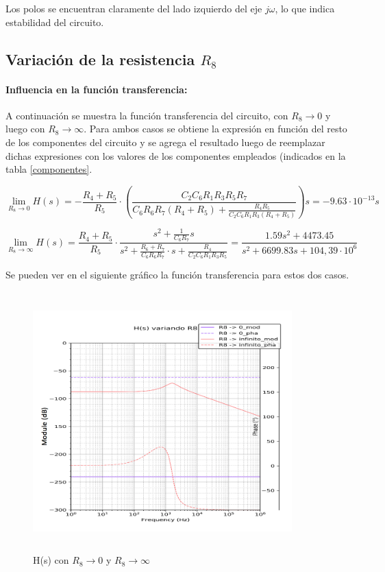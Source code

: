 Los polos se encuentran claramente del lado izquierdo del eje $j\omega$, lo que indica estabilidad del circuito.


\subsection{Variaci\'on de la resistencia $R_8$}

\paragraph*{Influencia en la funci\'on transferencia:} A continuaci\'on se muestra la funci\'on transferencia del circuito, con $R_8\to 0$ y luego con $R_8\to \infty$. Para ambos casos se obtiene la expresi\'on en funci\'on del resto de los componentes del circuito y se agrega el resultado luego de reemplazar dichas expresiones con los valores de los componentes empleados (indicados en la tabla \ref{componentes}.

\begin{equation}
\lim_{R_8\to 0} H(s) = - \frac{R_4 + R_5}{R_5} \cdot 
\left(\frac{C_2 C_6 R_1 R_3 R_5 R_7}{C_6 R_6 R_7(R_4 + R_5)+\frac{R_4 R_5}{C_2 C_6 R_1 R_3 (R_4+R_5)}}\right)s = - 9.63 \cdot 10^{-13} s
\end{equation}

\begin{equation}
\lim_{R_8\to \infty} H(s) = \frac{R_4 + R_5}{R_5} \cdot \frac{s^2 + \frac{1}{C_6 R_7}s}{s^2 + \frac{R_6 + R_7}{C_6 R_6 R_7}\cdot s + \frac{R_4}{C_2 C_6 R_1 R_3 R_5}} = \frac{1.59 s^{2} + 4473.45}{s^{2} + 6699.83 s + 104,39 \cdot 10^6}
\end{equation}

Se pueden ver en el siguiente gr\'afico la funci\'on transferencia para estos dos casos.

\begin{figure}[H] %
	\centering
	\includegraphics[width=10cm,height=10cm,keepaspectratio]{../EJ1/00GRAFICOS/r88.png}
	\caption{H(s) con $R_8 \to 0$ y $R_8 \to \infty$}
	\label{r8}
\end{figure}

